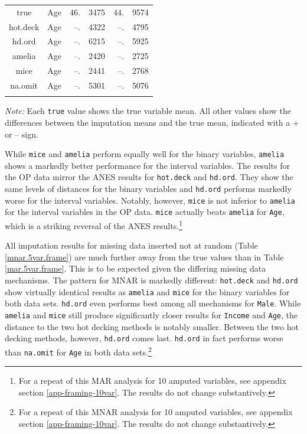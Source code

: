 \documentclass[12pt,econ]{sources/authesis}
\begin{document}
\begin{table}[H]
\begin{threeparttable}
\begin{tabular}{ccr@{}lr@{}l}
 true & Age & 46.&3475 & 44.&9574 \\ 
 hot.deck & Age & --.&4322 & --.&4795 \\
 hd.ord & Age & --.&6215 & --.&5925 \\
 amelia & Age & --.&2420 & --.&2725 \\ 
 mice & Age & --.&2441 & --.&2768 \\ 
 na.omit & Age & --.&5301 & --.&5076 \\
 \hline \\[-1.8ex] 
\end{tabular} 
\begin{tablenotes}
\footnotesize{\textit{Note:} Each \texttt{true} value shows the true variable mean. All other values show the differences between the imputation means and the true mean, indicated with a + or -- sign.}
\end{tablenotes}
\end{threeparttable}
\end{table}
\dsp

While \texttt{mice} and \texttt{amelia} perform equally well for the binary variables, \texttt{amelia} shows a markedly better performance for the interval variables. The results for the OP data mirror the ANES results for \texttt{hot.deck} and \texttt{hd.ord}. They show the same levels of distances for the binary variables and \texttt{hd.ord} performs markedly worse for the interval variables. Notably, however, \texttt{mice} is not inferior to \texttt{amelia} for the interval variables in the OP data. \texttt{mice} actually beats \texttt{amelia} for \texttt{Age}, which is a striking reversal of the ANES results.\footnote{For a repeat of this MAR analysis for 10 amputed variables, see appendix section \ref{app-framing-10var}. The results do not change substantively.}

All imputation results for missing data inserted not at random (Table \ref{mnar.5var.frame}) are much further away from the true values than in Table \ref{mar.5var.frame}. This is to be expected given the differing missing data mechanisms. The pattern for MNAR is markedly different: \texttt{hot.deck} and \texttt{hd.ord} show virtually identical results as \texttt{amelia} and \texttt{mice} for the binary variables for both data sets. \texttt{hd.ord} even performs best among all mechanisms for \texttt{Male}. While \texttt{amelia} and \texttt{mice} still produce significantly closer results for \texttt{Income} and \texttt{Age}, the distance to the two hot decking methods is notably smaller. Between the two hot decking methods, however, \texttt{hd.ord} comes last. \texttt{hd.ord} in fact performs worse than \texttt{na.omit} for \texttt{Age} in both data sets.\footnote{For a repeat of this MNAR analysis for 10 amputed variables, see appendix section \ref{app-framing-10var}. The results do not change substantively.}
\end{document}
